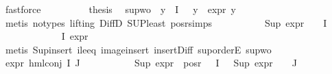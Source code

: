 \begin{isabellebody}
\ fastforce\isanewline
\ \ \ \ \ \ \isamarkupfalse%
\ \isamarkupfalse%
\ {\isacharquery}{\kern0pt}thesis\ \isamarkupfalse%
\ sup{\isacharunderscore}{\kern0pt}wo{\isacharunderscore}{\kern0pt}{\isasympsi}\ \ {\isacartoucheopen}{\isasymforall}y{\isasymin}{\isasymPhi}\ {\isacharbackquote}{\kern0pt}\ I{\isachardot}{\kern0pt}\ {\isasympsi}\ {\isasymnoteq}\ y\ {\isasymlongrightarrow}\ expr{\isacharunderscore}{\kern0pt}{}\ y\ {\isasymle}\ {}{\isacartoucheclose}\isanewline
\ \ \ \ \ \ \ \ \isamarkupfalse%
\ {\isacharparenleft}{\kern0pt}metis\ {\isacharparenleft}{\kern0pt}no{\isacharunderscore}{\kern0pt}types{\isacharcomma}{\kern0pt}\ lifting{\isacharparenright}{\kern0pt}\ DiffD{}\ SUP{\isacharunderscore}{\kern0pt}least\ pos{\isacharunderscore}{\kern0pt}r{\isachardot}{\kern0pt}simps{\isacharparenright}{\kern0pt}\isanewline
\ \ \ \ \isamarkupfalse%
\isanewline
\ \ \ \ \isamarkupfalse%
\ {\isachardoublequoteopen}Sup\ {\isacharparenleft}{\kern0pt}expr{\isacharunderscore}{\kern0pt}{}\ {\isacharbackquote}{\kern0pt}\ {\isacharparenleft}{\kern0pt}{\isasymPhi}\ {\isacharbackquote}{\kern0pt}\ I{\isacharparenright}{\kern0pt}{\isacharparenright}{\kern0pt}\ {\isasymle}\ {}{\isachardoublequoteclose}\isanewline
\ \ \ \ \ \ \isamarkupfalse%
\ \ {\isacartoucheopen}{\isasympsi}\ {\isasymin}\ {\isasymPhi}\ {\isacharbackquote}{\kern0pt}\ I{\isacartoucheclose}\ {\isacartoucheopen}expr{\isacharunderscore}{\kern0pt}{}\ {\isasympsi}\ {\isasymle}\ {}{\isacartoucheclose}\isanewline
\ \ \ \ \ \ \isamarkupfalse%
\ {\isacharparenleft}{\kern0pt}metis\ Sup{\isacharunderscore}{\kern0pt}insert\ ile{}{\isacharunderscore}{\kern0pt}eq\ image{\isacharunderscore}{\kern0pt}insert\ insert{\isacharunderscore}{\kern0pt}Diff\ sup{\isachardot}{\kern0pt}orderE\ sup{\isacharunderscore}{\kern0pt}wo{\isacharunderscore}{\kern0pt}{\isasympsi}{\isacharparenleft}{\kern0pt}{}{\isacharparenright}{\kern0pt}{\isacharparenright}{\kern0pt}\isanewline
\ \ \ \ \isamarkupfalse%
\ {\isachardoublequoteopen}expr{\isacharunderscore}{\kern0pt}{}\ {\isacharparenleft}{\kern0pt}hml{\isacharunderscore}{\kern0pt}conj\ I\ J\ {\isasymPhi}{\isacharparenright}{\kern0pt}\ {\isasymle}\ {}{\isachardoublequoteclose}\isanewline
\ \ \ \ \ \ \isamarkupfalse%
\ {\isacartoucheopen}Sup\ {\isacharparenleft}{\kern0pt}expr{\isacharunderscore}{\kern0pt}{}\ {\isacharbackquote}{\kern0pt}\ pos{\isacharunderscore}{\kern0pt}r\ {\isacharparenleft}{\kern0pt}{\isasymPhi}\ {\isacharbackquote}{\kern0pt}\ I{\isacharparenright}{\kern0pt}{\isacharparenright}{\kern0pt}\ {\isasymle}\ {}{\isacartoucheclose}\ {\isacartoucheopen}Sup\ {\isacharparenleft}{\kern0pt}{\isacharparenleft}{\kern0pt}expr{\isacharunderscore}{\kern0pt}{}\ {\isasymcirc}\ {\isasymPhi}{\isacharparenright}{\kern0pt}\ {\isacharbackquote}{\kern0pt}\ J{\isacharparenright}{\kern0pt}\ {\isasymle}\ {}{\isacartoucheclose}\isanewline

\end{isabellebody}
